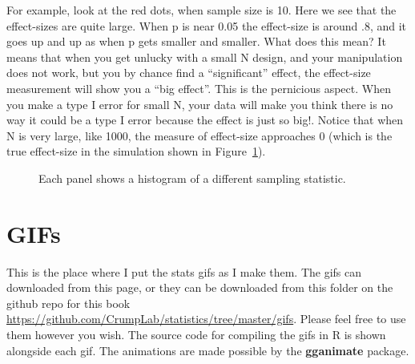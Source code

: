\documentclass[
  letterpaper,
  DIV=11,
  numbers=noendperiod]{scrreprt}
\begin{document}
For example, look at the red dots, when sample size is 10. Here we see
that the effect-sizes are quite large. When p is near 0.05 the
effect-size is around .8, and it goes up and up as when p gets smaller
and smaller. What does this mean? It means that when you get unlucky
with a small N design, and your manipulation does not work, but you by
chance find a ``significant'' effect, the effect-size measurement will
show you a ``big effect''. This is the pernicious aspect. When you make
a type I error for small N, your data will make you think there is no
way it could be a type I error because the effect is just so big!.
Notice that when N is very large, like 1000, the measure of effect-size
approaches 0 (which is the true effect-size in the simulation shown in
Figure~\ref{fig-13cohensD}).

\begin{figure}


\caption{\label{fig-13cohensD}Each panel shows a histogram of a
different sampling statistic.}

\end{figure}%


\chapter{GIFs}\label{gifs}

This is the place where I put the stats gifs as I make them. The gifs
can downloaded from this page, or they can be downloaded from this
folder on the github repo for this book
\url{https://github.com/CrumpLab/statistics/tree/master/gifs}. Please
feel free to use them however you wish. The source code for compiling
the gifs in R is shown alongside each gif. The animations are made
possible by the \textbf{gganimate} package.
\end{document}

